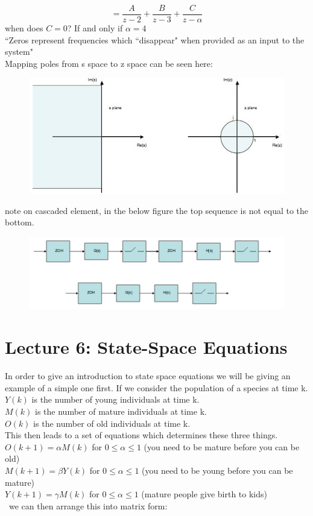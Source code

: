 \documentclass[a4paper,11pt]{article}
\begin{document}
	\begin{equation}
		=\frac{A}{z-2}+\frac{B}{z-3}+\frac{C}{z-\alpha}
	\end{equation} 
	when does $C=0$? If and only if $\alpha = 4$\\
	``Zeros represent frequencies which ``disappear" when provided as an input to the system"\\
	Mapping poles from s space to z space can be seen here:
	\FloatBarrier
	\begin{figure}[htp]
		\centering
		\includegraphics[scale=0.3]{images/mapping}
	\end{figure}
	\FloatBarrier
	
	note on cascaded element, in the below figure the top sequence is not equal to the bottom. 
	\FloatBarrier
	\begin{figure}[htp]
		\centering
		\includegraphics[scale=0.7]{images/cascading}
	\end{figure}
	\section{Lecture 6: State-Space Equations}
	In order to give an introduction to state space equations we will be giving an example of a simple one first.
	If we consider the population of a species at time k.\\
	$Y(k)$ is the number of young individuals at time k.\\
	$M(k)$ is the number of mature individuals at time k.\\
	$O(k)$ is the number of old individuals at time k.\\
	This then leads to a set of equations which determines these three things.\\	
	$O(k+1)=\alpha M(k)$ for $0 \leq \alpha \leq 1$ (you need to be mature before you can be old)\\
	$M(k+1)=\beta Y(k)$ for $0 \leq \alpha \leq 1$ (you need to be young before you can be mature)\\
	$Y(k+1)=\gamma M(k)$ for $0 \leq \alpha \leq 1$ (mature people give birth to kids)\\\
	we can then arrange this into matrix form:
	
\end{document}
